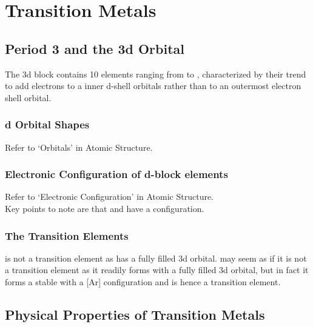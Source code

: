 \documentclass[../main]{subfiles}
\begin{document}
\section{Transition Metals}

	\subsection{Period 3 and the 3d Orbital}

	The 3d block contains 10 elements ranging from  to , characterized by their trend to add electrons to a inner d-shell orbitals rather than to an outermost electron shell orbital.

	\subsubsection{d Orbital Shapes}

	Refer to `Orbitals' in Atomic Structure. \\

	\subsubsection{Electronic Configuration of d-block elements}

	Refer to `Electronic Configuration' in Atomic Structure. \\

	Key points to note are that  and  have a  configuration. \\

	\subsubsection{The Transition Elements}


	 is not a transition element as  has a fully filled 3d orbital.  may seem as if it is not a transition element as it readily forms  with a fully filled 3d orbital, but in fact it forms a stable  with a [Ar]  configuration and is hence a transition element. \\

	\subsection{Physical Properties of Transition Metals}
\end{document}
